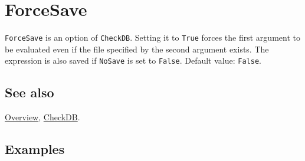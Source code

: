 \documentclass[../FeynCalcManual.tex]{subfiles}
\begin{document}
\hypertarget{forcesave}{%
\section{ForceSave}\label{forcesave}}

\texttt{ForceSave} is an option of \texttt{CheckDB}. Setting it to
\texttt{True} forces the first argument to be evaluated even if the file
specified by the second argument exists. The expression is also saved if
\texttt{NoSave} is set to \texttt{False}. Default value: \texttt{False}.

\subsection{See also}

\hyperlink{toc}{Overview}, \hyperlink{checkdb}{CheckDB}.

\subsection{Examples}
\end{document}
